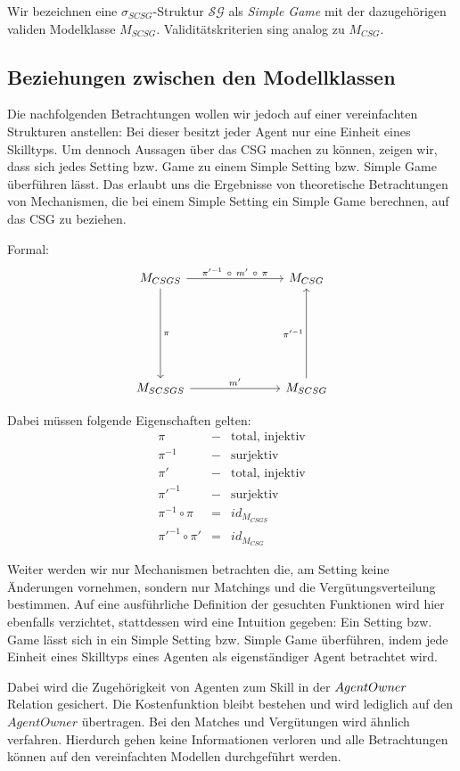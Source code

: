 \noindent
Wir bezeichnen eine $\sigma_{SCSG}$-Struktur $\mathcal{SG}$ als \textit{Simple Game} mit der dazugehörigen validen Modelklasse $M_{SCSG}$. Validitätskriterien sing analog zu $M_{CSG}$.


\subsection{Beziehungen zwischen den Modellklassen}
\label{bez}

Die nachfolgenden Betrachtungen wollen wir jedoch auf einer vereinfachten Strukturen anstellen: Bei  dieser besitzt jeder Agent nur eine Einheit eines Skilltyps. Um dennoch Aussagen über das CSG machen zu können, zeigen wir, dass sich jedes Setting bzw. Game zu einem Simple Setting bzw. Simple Game überführen lässt. Das erlaubt uns die Ergebnisse von  theoretische Betrachtungen von Mechanismen, die bei einem Simple Setting ein Simple Game berechnen, auf das CSG zu beziehen.


\noindent
Formal:
\[
\begin{tikzcd}[column sep=1in,row sep=1in]
M_{CSGS} \arrow{d}{\pi} \arrow{r}{\pi'^{-1}\ \circ\  m'\ \circ\ \pi} & M_{CSG} \\
M_{SCSGS} \arrow{r}{m'} & M_{SCSG} \arrow{u}{\pi'^{-1}}
\end{tikzcd}
\]

\noindent
Dabei müssen folgende Eigenschaften gelten:
\begin{eqnarray}
  \pi &-&\text{total, injektiv} \\
  \pi^{-1}&-&\text{surjektiv} \\
  \pi' &-&\text{total, injektiv} \\
  \pi'^{-1}&-&\text{surjektiv} \\
  \pi^{-1}\circ\pi &=& id_{M_{CSGS}} \\
  \pi'^{-1}\circ\pi' &=& id_{M_{CSG}}
\end{eqnarray}

\noindent
Weiter werden wir nur Mechanismen betrachten die, am Setting keine Änderungen vornehmen, sondern nur Matchings und die Vergütungsverteilung bestimmen. Auf eine ausführliche Definition der gesuchten Funktionen wird hier ebenfalls verzichtet,  stattdessen wird eine Intuition gegeben: Ein Setting bzw. Game lässt sich in ein Simple Setting bzw. Simple Game überführen, indem jede Einheit eines Skilltyps eines Agenten als eigenständiger Agent betrachtet wird.

Dabei wird die Zugehörigkeit von Agenten zum Skill in der $Agent\-Owner$ Relation gesichert. Die Kostenfunktion bleibt bestehen und wird lediglich auf den $AgentOwner$ übertragen. Bei den Matches und Vergütungen wird ähnlich verfahren. Hierdurch gehen keine Informationen verloren und alle Betrachtungen können auf den vereinfachten Modellen durchgeführt werden.



